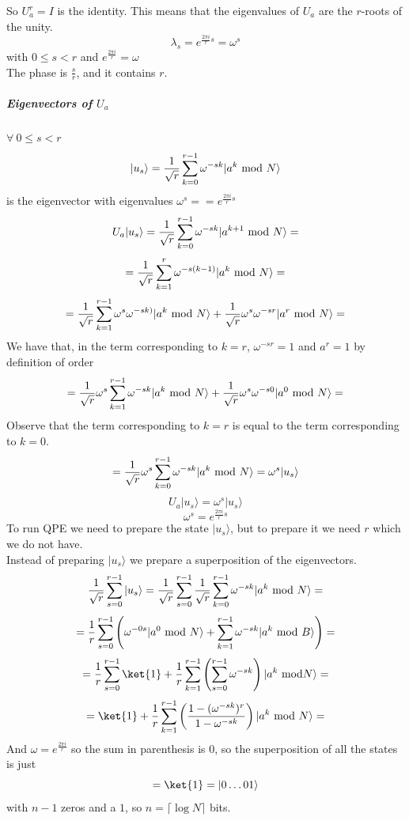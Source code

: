 \documentclass[10pt]{report}
\begin{document}
So $U_a^r = I$ is the identity. This means that the eigenvalues of $U_a$ are the $r$-roots of the unity.
$$\lambda_s = e^{\frac{2\pi i}{r}s} = \omega^s$$ with $0\leq s<r$ and $e^{\frac{2\pi i}{r}} = \omega$\\
The phase is $\frac{s}{r}$, and it contains $r$.
\subparagraph{Eigenvectors of $U_a$} $\forall\:0\leq s< r$ $$|u_s\rangle = \frac{1}{\sqrt{r}}\sum_{k=0}^{r-1}\omega^{-sk}|a^k\hbox{ mod }N\rangle$$
is the eigenvector with eigenvalues $\omega^s == e^{\frac{2\pi i}{r}s}$\\
$$U_a|u_s\rangle = \frac{1}{\sqrt{r}}\sum_{k=0}^{r-1}\omega^{-sk}|a^{k+1}\hbox{ mod }N\rangle =$$ $$= \frac{1}{\sqrt{r}}\sum_{k=1}^{r}\omega^{-s(k-1)}|a^k\hbox{ mod }N\rangle =$$ $$=\frac{1}{\sqrt{r}}\sum_{k=1}^{r-1}\omega^s\omega^{-sk)}|a^k\hbox{ mod }N\rangle + \frac{1}{\sqrt{r}}\omega^s\omega^{-sr}|a^r\hbox{ mod }N\rangle= $$ We have that, in the term corresponding to $k=r$, $\omega^{-sr}=1$ and $a^r=1$ by definition of order $$=\frac{1}{\sqrt{r}}\omega^s\sum_{k=1}^{r-1} \omega^{-sk}|a^k\hbox{ mod }N\rangle + \frac{1}{\sqrt{r}}\omega^s\omega^{-s0}|a^0\hbox{ mod }N\rangle  =$$ Observe that the term corresponding to $k=r$ is equal to the term corresponding to $k=0$.
$$=\frac{1}{\sqrt{r}}\omega^s\sum_{k=0}^{r-1}\omega^{-sk}|a^k\hbox{ mod }N\rangle = \omega^s|u_s\rangle$$
$$U_a|u_s\rangle = \omega^s|u_s\rangle$$
$$\omega^s=e^{\frac{2\pi i}{r}s}$$
To run QPE we need to prepare the state $|u_s\rangle$, but to prepare it we need $r$ which we do not have.\\
Instead of preparing $|u_s\rangle$ we prepare a superposition of the eigenvectors.
$$\frac{1}{\sqrt{r}}\sum_{s=0}^{r-1}|u_s\rangle =\frac{1}{\sqrt{r}}\sum_{s=0}^{r-1}\frac{1}{\sqrt{r}}\sum_{k=0}^{r-1}\omega^{-sk}|a^k\hbox{ mod }N\rangle =$$
$$ = \frac{1}{r}\sum_{s=0}^{r-1}\left( \omega^{-0s}|a^0\hbox{ mod }N\rangle+\sum_{k=1}^{r-1}\omega^{-sk}|a^k\hbox{ mod }B\rangle \right) =$$
$$= \frac{1}{r}\sum_{s=0}^{r-1}\ket{1}+\frac{1}{r}\sum_{k=1}^{r-1}\left(\sum_{s=0}^{r-1}\omega^{-sk}\right)|a^k\hbox{ mod} N\rangle =$$
$$=\ket{1} + \frac{1}{r}\sum_{k=1}^{r-1}\left(\frac{1-(\omega^{-sk})^r}{1-\omega^{-sk}}\right)|a^k\hbox{ mod }N\rangle =$$
And $\omega = e^{\frac{2\pi i}{r}}$ so the sum in parenthesis is $0$, so the superposition of all the states is just 
$$=\ket{1} = |0\ldots01\rangle$$
with $n-1$ zeros and a $1$, so $n=\lceil\log N\rceil$ bits.
\end{document}
